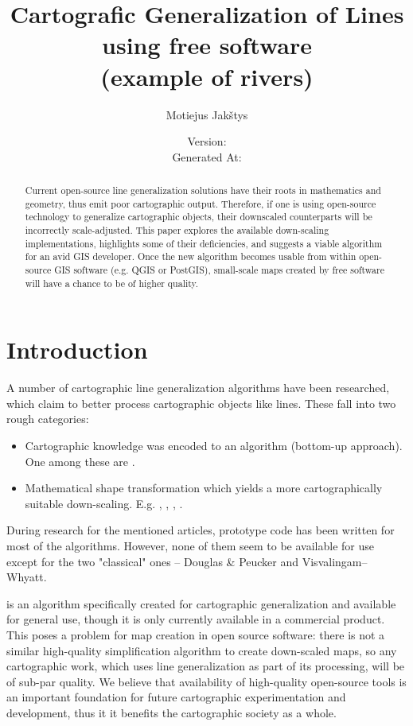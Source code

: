 \documentclass[a4paper]{article}
\title{
    Cartografic Generalization of Lines using free software \\
    (example of rivers) \\ \vspace{4mm}
}
\author{Motiejus Jakštys}
\date{
    \vspace{10mm}
    Version: \VCDescribe \\ \vspace{4mm}
    Generated At: \GeneratedAt
}
\newcommand{\DP}{Douglas \& Peucker}
\newcommand{\VW}{Visvalingam--Whyatt}
\begin{document}
\maketitle

\begin{abstract}
\label{sec:abstract}
Current open-source line generalization solutions have their roots in
    mathematics and geometry, thus emit poor cartographic output. Therefore, if
    one is using open-source technology to generalize cartographic objects,
    their downscaled counterparts will be incorrectly scale-adjusted. This
    paper explores the available down-scaling implementations, highlights some
    of their deficiencies, and suggests a viable algorithm for an avid GIS
    developer. Once the new algorithm becomes usable from within open-source
    GIS software (e.g. QGIS or PostGIS), small-scale maps created by free
    software will have a chance to be of higher quality.
\end{abstract}

\newpage

\tableofcontents
\listoffigures

\newpage

\section{Introduction}
\label{sec:introduction}

A number of cartographic line generalization algorithms have been researched,
which claim to better process cartographic objects like lines. These fall into
two rough categories:
\begin{itemize}
    \item Cartographic knowledge was encoded to an algorithm (bottom-up
        approach). One among these are \cite{wang1998line}.
    \item Mathematical shape transformation which yields a more
        cartographically suitable down-scaling. E.g. \cite{jiang2003line},
        \cite{dyken2009simultaneous}, \cite{mustafa2006dynamic},
        \cite{nollenburg2008morphing}.
\end{itemize}

During research for the mentioned articles, prototype code has been written for
most of the algorithms. However, none of them seem to be available for use
except for the two "classical" ones -- {\DP} and {\VW}.

\cite{wang1998line} is an algorithm specifically created for cartographic
generalization and available for general use, though it is only currently
available in a commercial product. This poses a problem for map creation in
open source software: there is not a similar high-quality simplification
algorithm to create down-scaled maps, so any cartographic work, which uses line
generalization as part of its processing, will be of sub-par quality.
We believe that availability of high-quality open-source tools is an important
foundation for future cartographic experimentation and development, thus it
it benefits the cartographic society as a whole.
\end{document}
